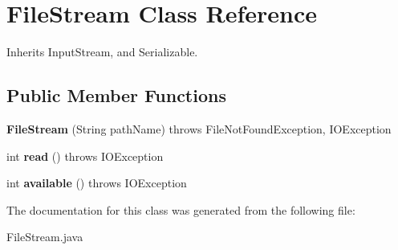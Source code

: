 \hypertarget{class_file_stream}{}\section{File\+Stream Class Reference}
\label{class_file_stream}


Inherits Input\+Stream, and Serializable.

\subsection*{Public Member Functions}
\begin{DoxyCompactItemize}
\item 
\mbox{\label{class_file_stream_a120b1fd6e4c74e93199d063da1c65b98}} 
{\bfseries File\+Stream} (String path\+Name)  throws File\+Not\+Found\+Exception, I\+O\+Exception    
\item 
\mbox{\label{class_file_stream_a7f2ea40eff2241931a4ca971364cd532}} 
int {\bfseries read} ()  throws I\+O\+Exception     
\item 
\mbox{\label{class_file_stream_a7dd240b96afa9e37f9a6bd8e4b99e48b}} 
int {\bfseries available} ()  throws I\+O\+Exception     
\end{DoxyCompactItemize}


The documentation for this class was generated from the following file\+:\begin{DoxyCompactItemize}
\item 
File\+Stream.\+java\end{DoxyCompactItemize}
